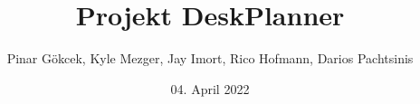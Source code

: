 \documentclass{article}
\title{Projekt DeskPlanner}
\author{Pinar Gökcek, Kyle Mezger, Jay Imort, Rico Hofmann, Darios Pachtsinis}
\date{04. April 2022}
\begin{document}
\begin{titlepage}
    \centering
    \maketitle

    \vfill

\end{titlepage}

\tableofcontents

% 

% 


\end{document}
